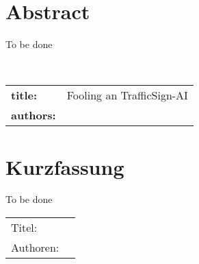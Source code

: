 \chapter*{Abstract} %
To be done

~\newline
~\newline
\begin{flushleft}
	\begin{tabular}{lp{11cm}}
		\textbf{title:} & Fooling an TrafficSign-AI \\
		\textbf{authors:}  & \autor \\
		
	\end{tabular} 
\end{flushleft}


\chapter*{Kurzfassung} 
To be done
~\newline
\begin{flushleft}
	\begin{tabular}{lp{11cm}}
		Titel:&  \titel \\ 
		Authoren:&  \autor \\
	\end{tabular} 
\end{flushleft}